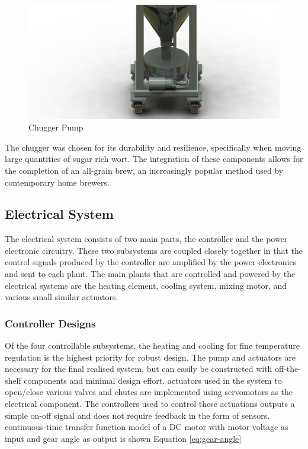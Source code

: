 \documentclass{article}
\begin{document}
\begin{figure}[H]
\begin{center}
\includegraphics[scale=0.10]{chugger-pump.png}
\caption{Chugger Pump}
\label{fig:chugger-pump}
\end{center}
\end{figure}

The chugger was chosen for its durability and resilience, specifically when moving large quantities of sugar rich wort.  The integration of these components allows for the completion of an all-grain brew, an increasingly popular method used by contemporary home brewers.


\subsection{Electrical System}
The electrical system consists of two main parts, the controller and the power electronic circuitry. These two subsystems are coupled closely together in that the control signals produced by the controller are amplified by the power electronics and sent to each plant. The main plants that are controlled and powered by the electrical systems are the heating element, cooling system, mixing motor, and various small similar actuators.
\subsubsection{Controller Designs}
Of the four controllable subsystems, the heating and cooling for fine temperature regulation is the highest priority for robust design. The pump and actuators are necessary for the final realised system, but can easily be constructed with off-the-shelf components and minimal design effort.
 actuators used in the system to open/close various valves and chutes are implemented using servomotors as the electrical component. The controllers used to control these actuations outputs a simple on-off signal and does not require feedback in the form of sensors.
 continuous-time transfer function model of a DC motor with motor voltage as input and gear angle as output is shown Equation \ref{eq:gear-angle}
\end{document}
